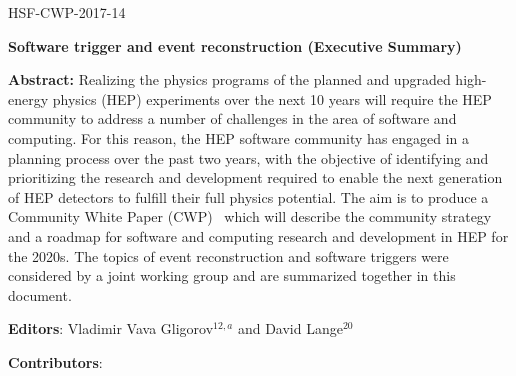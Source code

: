 \begin{flushright}
HSF-CWP-2017-14
\end{flushright}

\Large
\begin{center}
{\bf Software trigger and event reconstruction (Executive Summary)}
\end{center}
\vskip 1cm

\normalsize


\hangindent=1cm
{\bf Abstract:} Realizing the physics programs of the planned and upgraded high-energy physics (HEP) experiments over the next 10 years will require the HEP community to address a number of challenges in the area of software and computing. For this reason, the HEP software community has engaged in a planning process over the past two years, with the objective of identifying and prioritizing the research and development required to enable the next generation of HEP detectors to fulfill their full physics potential. The aim is to produce a Community White Paper (CWP)~\cite{HSF2017} which will describe the community strategy and a roadmap for software and computing research and development in HEP for the 2020s. The topics of event reconstruction and software triggers were considered by a joint working group and are summarized together in this document.

\vskip 1cm


\hangindent=1cm
{\bf Editors}: Vladimir Vava Gligorov$^{12,a}$ and David Lange$^{20}$

\vskip 0.2cm
\hangindent=1cm
{\bf Contributors}:

